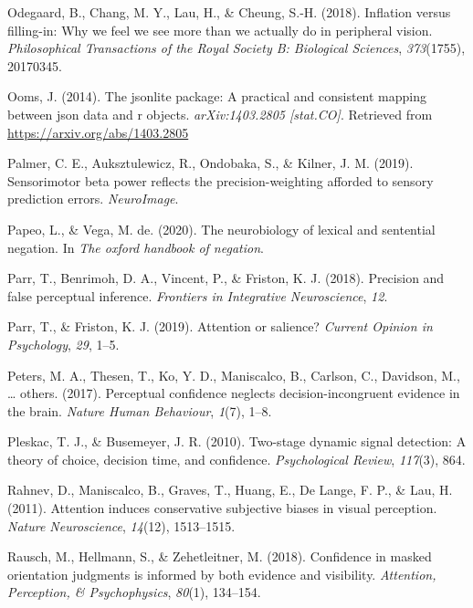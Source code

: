 \documentclass[12pt,twoside]{reedthesis}
\begin{document}
\leavevmode\hypertarget{ref-odegaard2018inflation}{}%
Odegaard, B., Chang, M. Y., Lau, H., \& Cheung, S.-H. (2018). Inflation versus filling-in: Why we feel we see more than we actually do in peripheral vision. \emph{Philosophical Transactions of the Royal Society B: Biological Sciences}, \emph{373}(1755), 20170345.

\leavevmode\hypertarget{ref-R-jsonlite}{}%
Ooms, J. (2014). The jsonlite package: A practical and consistent mapping between json data and r objects. \emph{arXiv:1403.2805 {[}stat.CO{]}}. Retrieved from \url{https://arxiv.org/abs/1403.2805}

\leavevmode\hypertarget{ref-palmer2019sensorimotor}{}%
Palmer, C. E., Auksztulewicz, R., Ondobaka, S., \& Kilner, J. M. (2019). Sensorimotor beta power reflects the precision-weighting afforded to sensory prediction errors. \emph{NeuroImage}.

\leavevmode\hypertarget{ref-papeo2020neurobiology}{}%
Papeo, L., \& Vega, M. de. (2020). The neurobiology of lexical and sentential negation. In \emph{The oxford handbook of negation}.

\leavevmode\hypertarget{ref-parr2018precision}{}%
Parr, T., Benrimoh, D. A., Vincent, P., \& Friston, K. J. (2018). Precision and false perceptual inference. \emph{Frontiers in Integrative Neuroscience}, \emph{12}.

\leavevmode\hypertarget{ref-parr2019attention}{}%
Parr, T., \& Friston, K. J. (2019). Attention or salience? \emph{Current Opinion in Psychology}, \emph{29}, 1--5.

\leavevmode\hypertarget{ref-peters2017perceptual}{}%
Peters, M. A., Thesen, T., Ko, Y. D., Maniscalco, B., Carlson, C., Davidson, M., \ldots{} others. (2017). Perceptual confidence neglects decision-incongruent evidence in the brain. \emph{Nature Human Behaviour}, \emph{1}(7), 1--8.

\leavevmode\hypertarget{ref-pleskac2010two}{}%
Pleskac, T. J., \& Busemeyer, J. R. (2010). Two-stage dynamic signal detection: A theory of choice, decision time, and confidence. \emph{Psychological Review}, \emph{117}(3), 864.

\leavevmode\hypertarget{ref-rahnev2011attention}{}%
Rahnev, D., Maniscalco, B., Graves, T., Huang, E., De Lange, F. P., \& Lau, H. (2011). Attention induces conservative subjective biases in visual perception. \emph{Nature Neuroscience}, \emph{14}(12), 1513--1515.

\leavevmode\hypertarget{ref-rausch2018confidence}{}%
Rausch, M., Hellmann, S., \& Zehetleitner, M. (2018). Confidence in masked orientation judgments is informed by both evidence and visibility. \emph{Attention, Perception, \& Psychophysics}, \emph{80}(1), 134--154.
\end{document}
